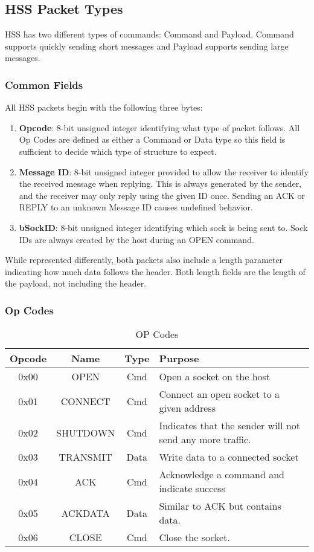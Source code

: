 \documentclass[10pt]{article}
\begin{document}
	\subsection{HSS Packet Types}
	HSS has two different types of commands: Command and Payload. Command supports quickly sending short messages and Payload supports sending large messages.
	\subsubsection{Common Fields}
	All HSS packets begin with the following three bytes:\\
	\begin{enumerate}
		\item \textbf{Opcode}: 8-bit unsigned integer identifying what type of packet follows. All Op Codes are defined as either a Command or Data type so this field is sufficient to decide which type of structure to expect.
		\item \textbf{Message ID}: 8-bit unsigned integer provided to allow the receiver to identify the received message when replying. This is always generated by the sender, and the receiver may only reply using the given ID once. Sending an ACK or REPLY to an unknown Message ID causes undefined behavior.
		\item \textbf{bSockID}: 8-bit unsigned integer identifying which sock is being sent to. Sock IDs are always created by the host during an OPEN command.
	\end{enumerate}
	While represented differently, both packets also include a length parameter indicating how much data follows the header. Both length fields are the length of the payload, not including the header. 
	
	\subsubsection{Op Codes}
	\begin{table}[h!]
		\begin{center}
			\caption{OP Codes}
			\label{tab:table1}
			\begin{tabular}{c|c|c|l} 
				\rowcolor{lightgray}
				\textbf{Opcode} &	\textbf{Name} &	\textbf{Type} & \textbf{Purpose}\\
				\hline
				0x00 & OPEN & Cmd & Open a socket on the host\\
				0x01 & CONNECT & Cmd & Connect an open socket to a given address\\
				0x02 & SHUTDOWN & Cmd & Indicates that the sender will not send any more traffic.\\
				0x03 & TRANSMIT & Data & Write data to a connected socket\\
				0x04 & ACK	& Cmd & Acknowledge a command and indicate success\\
				0x05 & ACKDATA	& Data & Similar to ACK but contains data. \\
				0x06 & CLOSE	& Cmd & Close the socket. \\
			\end{tabular}
		\end{center}
	\end{table}
\end{document}
